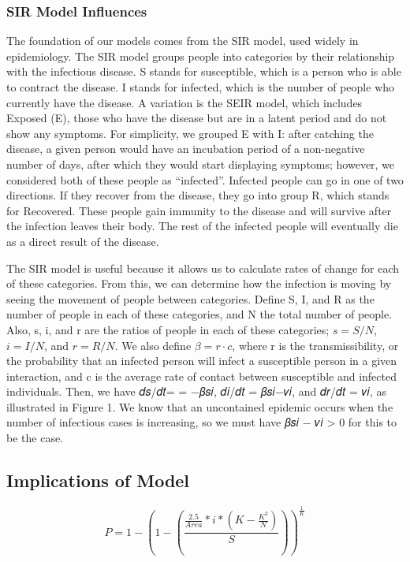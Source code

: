 \documentclass[12pt]{article}
\begin{document}
\subsubsection{SIR Model Influences}

The foundation of our models comes from the SIR model, used widely in epidemiology. The SIR model groups people into categories by their relationship with the infectious disease. S stands for susceptible, which is a person who is able to contract the disease. I stands for infected, which is the number of people who currently have the disease. A variation is the SEIR model, which includes Exposed (E), those who have the disease but are in a latent period and do not show any symptoms. For simplicity, we grouped E with I: after catching the disease, a given person would have an incubation period of a non-negative number of days, after which they would start displaying symptoms; however, we considered both of these people as “infected”. Infected people can go in one of two directions. If they recover from the disease, they go into group R, which stands for Recovered. These people gain immunity to the disease and will survive after the infection leaves their body. The rest of the infected people will eventually die as a direct result of the disease.

The SIR model is useful because it allows us to calculate rates of change for each of these categories. From this, we can determine how the infection is moving by seeing the movement of people between categories. Define S, I, and R as the number of people in each of these categories, and N the total number of people. Also, s, i, and r are the ratios of people in each of these categories; \(s=S/N\), \(i=I/N\), and \(r=R/N\). We also define \(\beta = r·c\), where r is the transmissibility, or the probability that an infected person will infect a susceptible person in a given interaction, and c is the average rate of contact between susceptible and infected individuals. Then, we have 𝑑𝑠/𝑑𝑡= = −𝛽𝑠𝑖, 𝑑𝑖/𝑑𝑡 = 𝛽𝑠𝑖−𝑣𝑖, and 𝑑𝑟/𝑑𝑡 = 𝑣𝑖, as illustrated in Figure 1. We know that an uncontained epidemic occurs when the number of infectious cases is increasing, so we must have 𝛽𝑠𝑖 − 𝜈𝑖 > 0 for this to be the case.

\subsection{Implications of Model}

\begin{center}
\[
P=1-(1-(\frac{\frac{2.5}{Area}*i*(K-\frac{K^2}{N})}{S}))^\frac{1}{K}
\]
\end{center}
\end{document}

